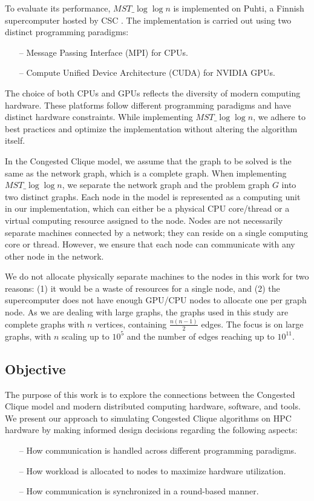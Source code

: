 \documentclass[english, 12pt, a4paper, elec, utf8, a-2b, online]{aaltothesis}
\newcommand{\mstalgo}{$MST\_\log\log{n}$}
\begin{document}
To evaluate its performance, \mstalgo{} is implemented on Puhti, a Finnish supercomputer hosted by CSC \cite{Puhti}. The implementation is carried out using two distinct programming paradigms:
\begin{itemize}
	\item[--] Message Passing Interface (MPI) for CPUs.
	\item[--] Compute Unified Device Architecture (CUDA) for NVIDIA GPUs.
\end{itemize}

The choice of both CPUs and GPUs reflects the diversity of modern computing hardware. These platforms follow different programming paradigms and have distinct hardware constraints. While implementing \mstalgo{}, we adhere to best practices and optimize the implementation without altering the algorithm itself.

In the Congested Clique model, we assume that the graph to be solved is the same as the network graph, which is a complete graph. When implementing \mstalgo{}, we separate the network graph and the problem graph $G$ into two distinct graphs. Each node in the model is represented as a computing unit in our implementation, which can either be a physical CPU core/thread or a virtual computing resource assigned to the node. Nodes are not necessarily separate machines connected by a network; they can reside on a single computing core or thread. However, we ensure that each node can communicate with any other node in the network.

We do not allocate physically separate machines to the nodes in this work for two reasons: (1) it would be a waste of resources for a single node, and (2) the supercomputer does not have enough GPU/CPU nodes to allocate one per graph node. As we are dealing with large graphs, the graphs used in this study are complete graphs with $n$ vertices, containing $\frac{n(n-1)}{2}$ edges. The focus is on large graphs, with $n$ scaling up to $10^5$ and the number of edges reaching up to $10^{11}$.

\subsection{Objective}
The purpose of this work is to explore the connections between the Congested Clique model and modern distributed computing hardware, software, and tools. We present our approach to simulating Congested Clique algorithms on HPC hardware by making informed design decisions regarding the following aspects:
\begin{itemize}
	\item[--] How communication is handled across different programming paradigms.
	\item[--] How workload is allocated to nodes to maximize hardware utilization.
	\item[--] How communication is synchronized in a round-based manner.
\end{itemize}
\end{document}
